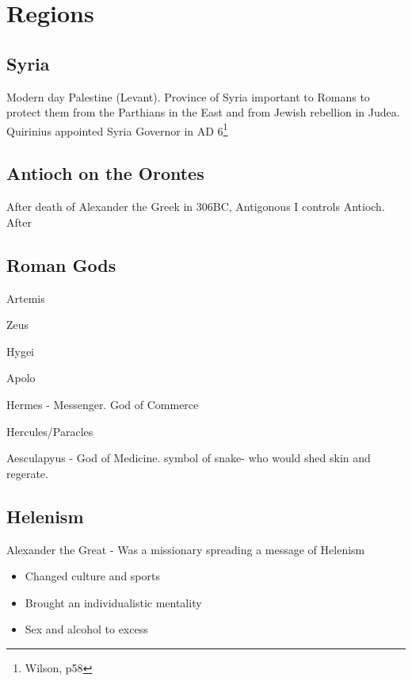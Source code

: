 \documentclass[
]{book}
\providecommand{\tightlist}{%
  \setlength{\itemsep}{0pt}\setlength{\parskip}{0pt}}
\begin{document}
\hypertarget{regions}{%
\section{Regions}\label{regions}}

\hypertarget{syria}{%
\subsection{Syria}\label{syria}}

Modern day Palestine (Levant). Province of Syria important to Romans to protect them from the Parthians in the East and from Jewish rebellion in Judea. Quirinius appointed Syria Governor in AD 6\footnote{Wilson, p58}

\hypertarget{antioch-on-the-orontes}{%
\subsection{Antioch on the Orontes}\label{antioch-on-the-orontes}}

After death of Alexander the Greek in 306BC, Antigonous I controls Antioch. After

\hypertarget{roman-gods}{%
\subsection{Roman Gods}\label{roman-gods}}

Artemis

Zeus

Hygei

Apolo

Hermes - Messenger. God of Commerce

Hercules/Paracles

Aesculapyus - God of Medicine. symbol of snake- who would shed skin and regerate.

\hypertarget{helenism}{%
\subsection{Helenism}\label{helenism}}

Alexander the Great - Was a missionary spreading a message of Helenism

\begin{itemize}
\tightlist
\item
  Changed culture and sports
\item
  Brought an individualistic mentality
\item
  Sex and alcohol to excess
\end{itemize}
\end{document}

